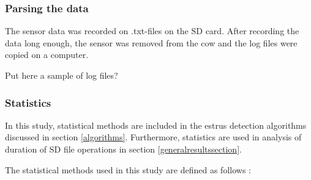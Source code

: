 \documentclass[english,12pt,a4paper,pdftex,elec,utf8]{aaltothesis}
\begin{document}
\subsubsection*{Parsing the data}

The sensor data was recorded on .txt-files on the SD card. After recording the data long enough, the sensor was removed from the cow and the log files were copied on a computer. 

Put here a sample of log files?

\subsubsection{Statistics} \label{statisticssection}

In this study, statistical methods are included in the estrus detection algorithms discussed in section \ref{algorithms}. Furthermore, statistics are used in analysis of duration of SD file operations in section \ref{generalresultssection}.


The statistical methods used in this study are defined as follows \cite{maoltaulukotmatematiikka}:
\end{document}
